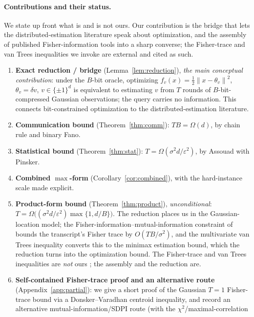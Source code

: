 \documentclass[11pt]{article}
\theoremstyle{definition}
\newcommand{\eps}{\varepsilon}
\newcommand{\norm}[1]{\left\lVert #1 \right\rVert}
\newcommand{\proven}{}
\begin{document}
\paragraph{Contributions and their status.} We state up front what is and is not ours. Our contribution
is the bridge that lets the distributed-estimation literature speak about optimization, and the
assembly of published Fisher-information tools into a sharp converse; the Fisher-trace and van Trees
inequalities we invoke are external and cited as such.
\begin{enumerate}[leftmargin=1.6em,itemsep=2pt]
  \item \textbf{Exact reduction / bridge} (Lemma~\ref{lem:reduction}), \emph{the main conceptual
  contribution}: under the $B$-bit oracle, optimizing $f_v(x)=\tfrac12\norm{x-\theta_v}^2$,
  $\theta_v=\delta v$, $v\in\{\pm1\}^d$ is equivalent to estimating $v$ from $T$ rounds of
  $B$-bit-compressed Gaussian observations; the query carries no information. This connects
  bit-constrained optimization to the distributed-estimation literature. \proven
  \item \textbf{Communication bound} (Theorem~\ref{thm:comm}): $TB=\Omega(d)$, by chain rule and binary
  Fano. \proven
  \item \textbf{Statistical bound} (Theorem~\ref{thm:stat}): $T=\Omega(\sigma^2 d/\eps^2)$, by Assouad
  with Pinsker. \proven
  \item \textbf{Combined $\max$-form} (Corollary~\ref{cor:combined}), with the hard-instance scale made
  explicit. \proven
  \item \textbf{Product-form bound} (Theorem~\ref{thm:product}), \emph{unconditional}:
  $T=\Omega\!\big((\sigma^2 d/\eps^2)\max\{1,d/B\}\big)$. The reduction places us in the Gaussian-location
  model; the Fisher-information--mutual-information constraint of \citet{barnes2021fisher} bounds the
  transcript's Fisher trace by $O(TB/\sigma^2)$, and the multivariate van Trees inequality
  \citep{gilllevit1995} converts this to the minimax estimation bound, which the reduction turns into the
  optimization bound. The Fisher-trace and van Trees inequalities are \emph{not} ours
  \citep{barnes2021fisher,barneshanozgur2020,gilllevit1995}; the assembly and the reduction are. \proven
  \item \textbf{Self-contained Fisher-trace proof and an alternative route} (Appendix~\ref{app:partial}):
  we give a short proof of the Gaussian $T=1$ Fisher-trace bound via a Donsker--Varadhan centroid
  inequality, and record an alternative mutual-information/SDPI route (with the $\chi^2$/maximal-correlation

\end{enumerate}
\end{document}
